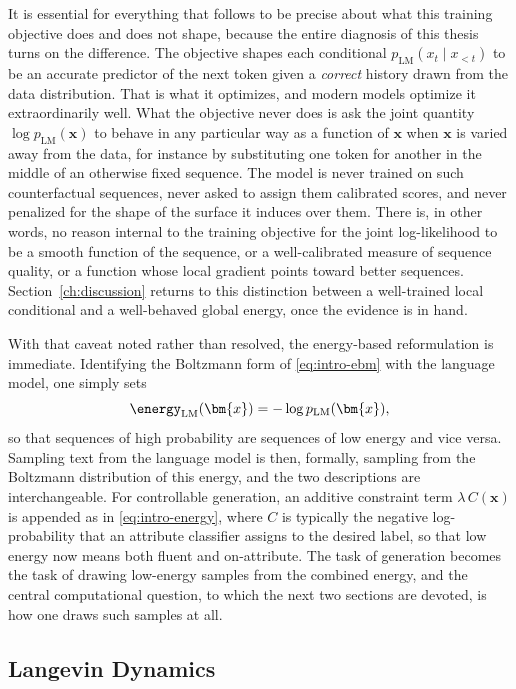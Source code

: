 It is essential for everything that follows to be precise about what this training objective does and does not shape, because the entire diagnosis of this thesis turns on the difference. The objective shapes each conditional $p_{\text{LM}}(x_t \mid x_{<t})$ to be an accurate predictor of the next token given a \emph{correct} history drawn from the data distribution. That is what it optimizes, and modern models optimize it extraordinarily well. What the objective never does is ask the joint quantity $\log p_{\text{LM}}(\bm{x})$ to behave in any particular way as a function of $\bm{x}$ when $\bm{x}$ is varied away from the data, for instance by substituting one token for another in the middle of an otherwise fixed sequence. The model is never trained on such counterfactual sequences, never asked to assign them calibrated scores, and never penalized for the shape of the surface it induces over them. There is, in other words, no reason internal to the training objective for the joint log-likelihood to be a smooth function of the sequence, or a well-calibrated measure of sequence quality, or a function whose local gradient points toward better sequences. Section~\ref{ch:discussion} returns to this distinction between a well-trained local conditional and a well-behaved global energy, once the evidence is in hand.

With that caveat noted rather than resolved, the energy-based reformulation is immediate. Identifying the Boltzmann form of \eqref{eq:intro-ebm} with the language model, one simply sets
\begin{equation}
    \energy_{\text{LM}}(\bm{x}) = -\log p_{\text{LM}}(\bm{x}),
    \label{eq:bg-energy}
\end{equation}
so that sequences of high probability are sequences of low energy and vice versa. Sampling text from the language model is then, formally, sampling from the Boltzmann distribution of this energy, and the two descriptions are interchangeable. For controllable generation, an additive constraint term $\lambda\, C(\bm{x})$ is appended as in \eqref{eq:intro-energy}, where $C$ is typically the negative log-probability that an attribute classifier assigns to the desired label, so that low energy now means both fluent and on-attribute. The task of generation becomes the task of drawing low-energy samples from the combined energy, and the central computational question, to which the next two sections are devoted, is how one draws such samples at all.

\subsection{Langevin Dynamics}
\label{sec:bg-langevin}

